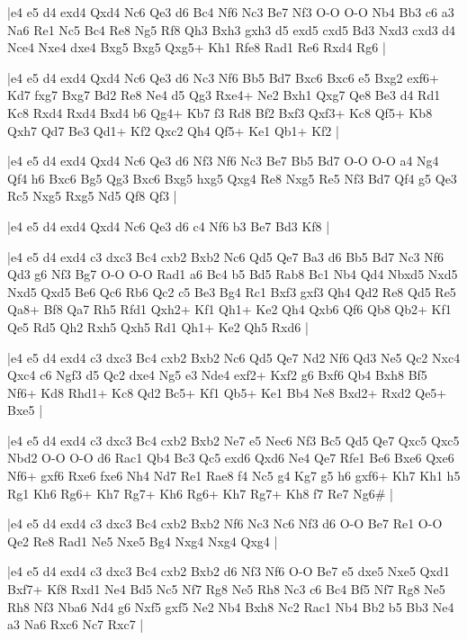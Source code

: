 \whitename{}
\blackname{}
\makegametitle
|e4 e5 d4 exd4 Qxd4 Nc6 Qe3 d6 Bc4 Nf6 Nc3 Be7 Nf3 O-O O-O Nb4 Bb3 c6 a3 Na6 Re1 Nc5 Bc4 Re8 Ng5 Rf8 Qh3 Bxh3 gxh3 d5 exd5 cxd5 Bd3 Nxd3 cxd3 d4 Nce4 Nxe4 dxe4 Bxg5 Bxg5 Qxg5+ Kh1 Rfe8 Rad1 Re6 Rxd4 Rg6  |

\whitename{}
\blackname{}
\makegametitle
|e4 e5 d4 exd4 Qxd4 Nc6 Qe3 d6 Nc3 Nf6 Bb5 Bd7 Bxc6 Bxc6 e5 Bxg2 exf6+ Kd7 fxg7 Bxg7 Bd2 Re8 Ne4 d5 Qg3 Rxe4+ Ne2 Bxh1 Qxg7 Qe8 Be3 d4 Rd1 Kc8 Rxd4 Rxd4 Bxd4 b6 Qg4+ Kb7 f3 Rd8 Bf2 Bxf3 Qxf3+ Kc8 Qf5+ Kb8 Qxh7 Qd7 Be3 Qd1+ Kf2 Qxc2 Qh4 Qf5+ Ke1 Qb1+ Kf2  |

\whitename{}
\blackname{}
\makegametitle
|e4 e5 d4 exd4 Qxd4 Nc6 Qe3 d6 Nf3 Nf6 Nc3 Be7 Bb5 Bd7 O-O O-O a4 Ng4 Qf4 h6 Bxc6 Bg5 Qg3 Bxc6 Bxg5 hxg5 Qxg4 Re8 Nxg5 Re5 Nf3 Bd7 Qf4 g5 Qe3 Rc5 Nxg5 Rxg5 Nd5 Qf8 Qf3  |

\whitename{}
\blackname{}
\makegametitle
|e4 e5 d4 exd4 Qxd4 Nc6 Qe3 d6 c4 Nf6 b3 Be7 Bd3 Kf8  |

\whitename{}
\blackname{}
\makegametitle
|e4 e5 d4 exd4 c3 dxc3 Bc4 cxb2 Bxb2 Nc6 Qd5 Qe7 Ba3 d6 Bb5 Bd7 Nc3 Nf6 Qd3 g6 Nf3 Bg7 O-O O-O Rad1 a6 Bc4 b5 Bd5 Rab8 Bc1 Nb4 Qd4 Nbxd5 Nxd5 Nxd5 Qxd5 Be6 Qc6 Rb6 Qc2 c5 Be3 Bg4 Rc1 Bxf3 gxf3 Qh4 Qd2 Re8 Qd5 Re5 Qa8+ Bf8 Qa7 Rh5 Rfd1 Qxh2+ Kf1 Qh1+ Ke2 Qh4 Qxb6 Qf6 Qb8 Qb2+ Kf1 Qe5 Rd5 Qh2 Rxh5 Qxh5 Rd1 Qh1+ Ke2 Qh5 Rxd6  |

\whitename{}
\blackname{}
\makegametitle
|e4 e5 d4 exd4 c3 dxc3 Bc4 cxb2 Bxb2 Nc6 Qd5 Qe7 Nd2 Nf6 Qd3 Ne5 Qc2 Nxc4 Qxc4 c6 Ngf3 d5 Qc2 dxe4 Ng5 e3 Nde4 exf2+ Kxf2 g6 Bxf6 Qb4 Bxh8 Bf5 Nf6+ Kd8 Rhd1+ Kc8 Qd2 Bc5+ Kf1 Qb5+ Ke1 Bb4 Ne8 Bxd2+ Rxd2 Qe5+ Bxe5  |

\whitename{}
\blackname{}
\makegametitle
|e4 e5 d4 exd4 c3 dxc3 Bc4 cxb2 Bxb2 Ne7 e5 Nec6 Nf3 Bc5 Qd5 Qe7 Qxc5 Qxc5 Nbd2 O-O O-O d6 Rac1 Qb4 Bc3 Qc5 exd6 Qxd6 Ne4 Qe7 Rfe1 Be6 Bxe6 Qxe6 Nf6+ gxf6 Rxe6 fxe6 Nh4 Nd7 Re1 Rae8 f4 Nc5 g4 Kg7 g5 h6 gxf6+ Kh7 Kh1 h5 Rg1 Kh6 Rg6+ Kh7 Rg7+ Kh6 Rg6+ Kh7 Rg7+ Kh8 f7 Re7 Ng6\#  |

\whitename{}
\blackname{}
\makegametitle
|e4 e5 d4 exd4 c3 dxc3 Bc4 cxb2 Bxb2 Nf6 Nc3 Nc6 Nf3 d6 O-O Be7 Re1 O-O Qe2 Re8 Rad1 Ne5 Nxe5 Bg4 Nxg4 Nxg4 Qxg4  |

\whitename{}
\blackname{}
\makegametitle
|e4 e5 d4 exd4 c3 dxc3 Bc4 cxb2 Bxb2 d6 Nf3 Nf6 O-O Be7 e5 dxe5 Nxe5 Qxd1 Bxf7+ Kf8 Rxd1 Ne4 Bd5 Nc5 Nf7 Rg8 Ne5 Rh8 Nc3 c6 Bc4 Bf5 Nf7 Rg8 Ne5 Rh8 Nf3 Nba6 Nd4 g6 Nxf5 gxf5 Ne2 Nb4 Bxh8 Nc2 Rac1 Nb4 Bb2 b5 Bb3 Ne4 a3 Na6 Rxc6 Nc7 Rxc7  |

